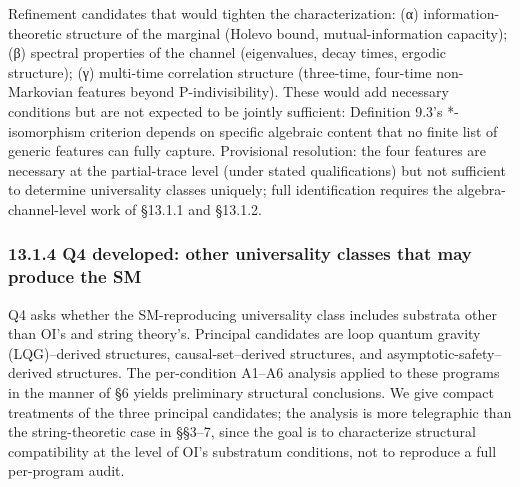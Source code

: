 \documentclass[
]{article}
\begin{document}
Refinement candidates that would tighten the characterization: (α)
information-theoretic structure of the marginal (Holevo bound,
mutual-information capacity); (β) spectral properties of the channel
(eigenvalues, decay times, ergodic structure); (γ) multi-time
correlation structure (three-time, four-time non-Markovian features
beyond P-indivisibility). These would add necessary conditions but are
not expected to be jointly sufficient: Definition 9.3's *-isomorphism
criterion depends on specific algebraic content that no finite list of
generic features can fully capture. Provisional resolution: the four
features are necessary at the partial-trace level (under stated
qualifications) but not sufficient to determine universality classes
uniquely; full identification requires the algebra-channel-level work of
§13.1.1 and §13.1.2.

\hypertarget{q4-developed-other-universality-classes-that-may-produce-the-sm}{%
\subsubsection{13.1.4 Q4 developed: other universality classes that may
produce the
SM}\label{q4-developed-other-universality-classes-that-may-produce-the-sm}}

Q4 asks whether the SM-reproducing universality class includes substrata
other than OI's and string theory's. Principal candidates are loop
quantum gravity (LQG)--derived structures, causal-set--derived
structures, and asymptotic-safety--derived structures. The per-condition
A1--A6 analysis applied to these programs in the manner of §6 yields
preliminary structural conclusions. We give compact treatments of the
three principal candidates; the analysis is more telegraphic than the
string-theoretic case in §§3--7, since the goal is to characterize
structural compatibility at the level of OI's substratum conditions, not
to reproduce a full per-program audit.
\end{document}
